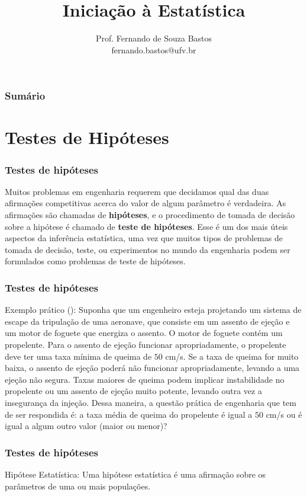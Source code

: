 \documentclass[14pt,aspectratio=1610]{beamer}
\title{Iniciação à Estatística}
\author{Prof. Fernando de Souza Bastos \texorpdfstring{\\ fernando.bastos@ufv.br}{}}
\institute{Departamento de Estatística \texorpdfstring{\\ Universidade Federal de Viçosa}{}\texorpdfstring{\\ Campus UFV - Viçosa}{}}
\date{}
\begin{document}


\frame{\titlepage}

\begin{frame}{}
\frametitle{\bf Sumário}
\tableofcontents
\end{frame}

\section{Testes de Hipóteses}
\begin{frame}{}
\frametitle{Testes de hipóteses}
\begin{block}{}
\justifying
Muitos problemas em engenharia requerem que decidamos qual das duas afirmações competitivas acerca do valor de algum parâmetro é verdadeira. As afirmações 
são chamadas de \textbf{hipóteses}, e o procedimento de tomada de decisão sobre a hipótese é chamado de \textbf{teste de hipóteses}. Esse é um dos mais úteis 
aspectos da inferência estatística, uma vez que muitos tipos de problemas de tomada de decisão, teste, ou experimentos no mundo da engenharia podem ser formulados 
como problemas de teste de hipóteses.
\end{block}
\end{frame}

\begin{frame}{}
\frametitle{Testes de hipóteses}
\begin{block}{Exemplo prático (\cite{montgomery2016}):}
\justifying
Suponha que um engenheiro esteja projetando um sistema de escape da tripulação de uma aeronave, que consiste em um assento de ejeção e um motor de foguete 
que energiza o assento. O motor de foguete contém um propelente. Para o assento de ejeção funcionar apropriadamente, o propelente deve ter uma taxa mínima de 
queima de $50$ cm/s. Se a taxa de queima for muito baixa, o assento de ejeção poderá não funcionar apropriadamente, levando a uma ejeção não segura. Taxas maiores 
de queima podem implicar instabilidade no propelente ou um assento de ejeção muito potente, levando outra vez a insegurança da injeção. Dessa maneira, a questão 
prática de engenharia que tem de ser respondida é: a taxa média de queima do propelente é igual a $50$ cm/s ou é igual a algum outro valor 
(maior ou menor)?
\end{block}
\end{frame}

\begin{frame}{}
\frametitle{Testes de hipóteses}
\begin{block}{Hipótese Estatística:}
Uma hipótese estatística é uma afirmação sobre os parâmetros de uma ou mais populações.
 \end{block}
\end{frame}
\end{document}

